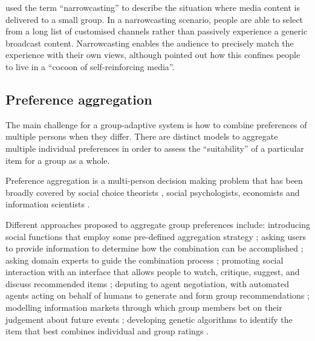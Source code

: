 \citet{Chae98} used the term ``narrowcasting'' to describe the situation where media content is delivered to a small group.
In a narrowcasting scenario, people are able to select from a long list of customised channels rather than passively experience a generic broadcast content.
Narrowcasting enables the audience to precisely match the experience with their own views, although \citet{Chaffee01} pointed out how this confines people to live in a ``cocoon of self-reinforcing media''. 



\subsection{Preference aggregation} %
\label{sub:preference_aggregation}

The main challenge for a group-adaptive system is how to combine preferences of multiple persons when they differ.
There are distinct models to aggregate multiple individual preferences in order to assess the ``suitability'' \cite{Jameson07b} of a particular item for a group as a whole. 

Preference aggregation is a multi-person decision making problem that has been broadly covered by social choice theorists \cite{Arrow70}, social psychologists, economists and information scientists \cite{Tindale03,List02}.





Different approaches proposed to aggregate group preferences include:
introducing social functions that employ some pre-defined aggregation strategy \cite{Masthoff04};
asking users to provide information to determine how the combination can be accomplished \cite{Jameson04};
asking domain experts to guide the combination process \cite{Ardissono03};
promoting social interaction with an interface that allows people to watch, critique, suggest, and discuss recommended items \cite{McCarthy06b}; 
deputing to agent negotiation, with automated agents acting on behalf of humans to generate and form group recommendations \cite{Bekkerman06};
modelling information markets through which group members bet on their judgement about future events \cite{Sunstein05};
developing genetic algorithms \cite{Holland75} to identify the item that best combines individual and group ratings \cite{Chen08}.


